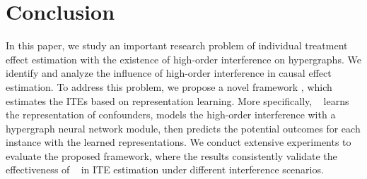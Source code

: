 \documentclass[sigconf]{acmart}
\begin{document}
\section{Conclusion}
\vspace{-1mm}
In this paper, we study an important research problem of individual treatment effect estimation with the existence of high-order interference on hypergraphs. We identify and analyze the influence of high-order interference in causal effect estimation. To address this problem, we propose a novel framework \mymodel, which estimates the ITEs based on representation learning. More specifically, \mymodel~ learns the representation of confounders, models the high-order interference with a hypergraph neural network module, then predicts the potential outcomes for each instance with the learned representations. We conduct extensive experiments to evaluate the proposed framework, where the results consistently validate the effectiveness of \mymodel~ in ITE estimation under different interference scenarios. 



\clearpage



\clearpage

\end{document}
